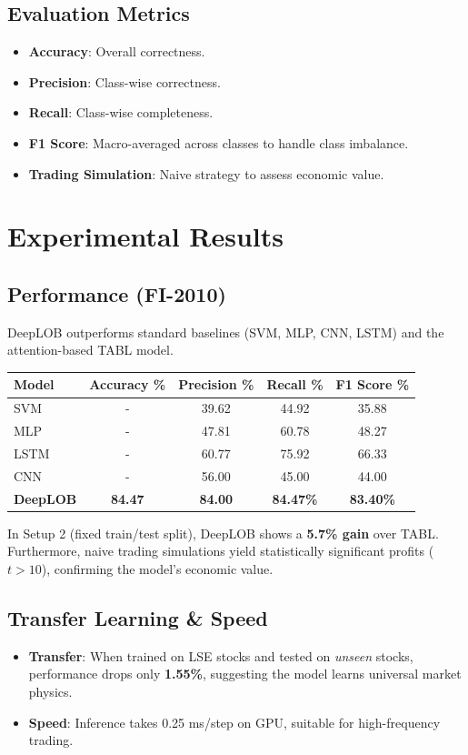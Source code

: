 \documentclass[10pt]{article}
\begin{document}
\subsection{Evaluation Metrics}
\begin{itemize}
    \item \textbf{Accuracy}: Overall correctness.
    \item \textbf{Precision}: Class-wise correctness.
    \item \textbf{Recall}: Class-wise completeness.
    \item \textbf{F1 Score}: Macro-averaged across classes to handle class imbalance.
    \item \textbf{Trading Simulation}: Naive strategy to assess economic value.
\end{itemize}

\section{Experimental Results}

\subsection{Performance (FI-2010)}
DeepLOB outperforms standard baselines (SVM, MLP, CNN, LSTM) and the attention-based TABL model.

\begin{table}[h]
\centering
\begin{tabular}{lcccc}
\toprule
\textbf{Model} & \textbf{Accuracy \%} & \textbf{Precision \%} & \textbf{Recall \%} & \textbf{F1 Score \%} \\
\midrule
SVM & - & 39.62 & 44.92 & 35.88 \\
MLP & - & 47.81 & 60.78 & 48.27 \\
LSTM & - & 60.77 & 75.92 & 66.33 \\
CNN & - & 56.00 & 45.00 & 44.00 \\
\textbf{DeepLOB} & \textbf{84.47} & \textbf{84.00} & \textbf{84.47\%} & \textbf{83.40\%} \\
\bottomrule
\end{tabular}
\end{table}

In Setup 2 (fixed train/test split), DeepLOB shows a \textbf{5.7\% gain} over TABL. Furthermore, naive trading simulations yield statistically significant profits ($t > 10$), confirming the model's economic value.

\subsection{Transfer Learning \& Speed}
\begin{itemize}
    \item \textbf{Transfer}: When trained on LSE stocks and tested on \textit{unseen} stocks, performance drops only \textbf{1.55\%}, suggesting the model learns universal market physics.
    \item \textbf{Speed}: Inference takes 0.25 ms/step on GPU, suitable for high-frequency trading.
\end{itemize}
\end{document}
